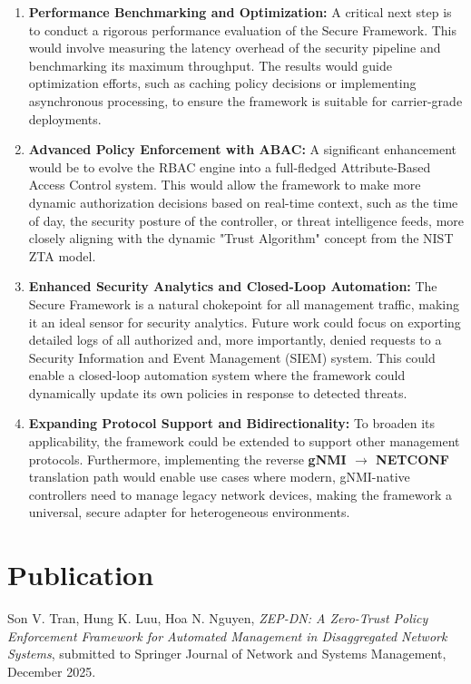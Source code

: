\documentclass[12pt, a4paper, reqno, oneside]{book}
\newcommand \chap[1]{%
  \chapter*{#1}%
  \addcontentsline{toc}{chapter}{#1}
  \markboth{#1}{}
}
\begin{document}
\begin{enumerate}
    \item \textbf{Performance Benchmarking and Optimization:} A critical next step is to conduct a rigorous performance evaluation of the Secure Framework. This would involve measuring the latency overhead of the security pipeline and benchmarking its maximum throughput. The results would guide optimization efforts, such as caching policy decisions or implementing asynchronous processing, to ensure the framework is suitable for carrier-grade deployments.

    \item \textbf{Advanced Policy Enforcement with ABAC:} A significant enhancement would be to evolve the RBAC engine into a full-fledged Attribute-Based Access Control system. This would allow the framework to make more dynamic authorization decisions based on real-time context, such as the time of day, the security posture of the controller, or threat intelligence feeds, more closely aligning with the dynamic "Trust Algorithm" concept from the NIST ZTA model.

    \item \textbf{Enhanced Security Analytics and Closed-Loop Automation:} The Secure Framework is a natural chokepoint for all management traffic, making it an ideal sensor for security analytics. Future work could focus on exporting detailed logs of all authorized and, more importantly, denied requests to a Security Information and Event Management (SIEM) system. This could enable a closed-loop automation system where the framework could dynamically update its own policies in response to detected threats.

    \item \textbf{Expanding Protocol Support and Bidirectionality:} To broaden its applicability, the framework could be extended to support other management protocols. Furthermore, implementing the reverse \textbf{gNMI $\rightarrow$ NETCONF} translation path would enable use cases where modern, gNMI-native controllers need to manage legacy network devices, making the framework a universal, secure adapter for heterogeneous environments.
\end{enumerate}



\chap{Publication}

\noindent [TVS1] Son V. Tran, Hung K. Luu, Hoa N. Nguyen, \textit{ZEP-DN: A Zero-Trust Policy Enforcement Framework for Automated Management in Disaggregated Network Systems}, submitted to Springer Journal of Network and Systems Management, December 2025. 
    

\newpage
{} 
% 


\end{document}
